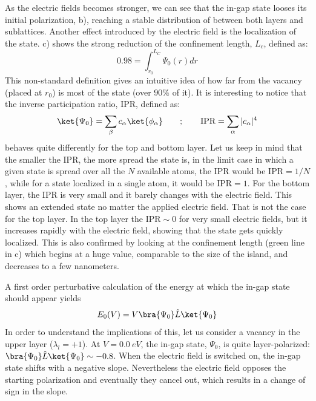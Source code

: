 As the electric fields becomes stronger, we can see that the in-gap state looses its initial polarization, b), reaching a stable distribution of between both layers and sublattices. Another effect introduced by the electric field is the localization of the state. c) shows the strong reduction of the confinement length, $L_c$, defined as:
\begin{equation}
  0.98 = \int_{r_0}^{L_C} \Psi_0(r) dr   %
\end{equation}
This non-standard definition gives an intuitive idea of how far from the vacancy (placed at $r_0$) is most of the state (over $90\%$ of it).
It is interesting to notice that the inverse participation ratio, IPR, defined as:
\begin{equation}
  \ket{\Psi_0} = \sum_\beta c_\alpha\ket{\phi_\alpha}\quad\quad;\quad\quad
  \text{IPR} = \sum_\alpha |c_\alpha|^4
\end{equation}
behaves quite differently for the top and bottom layer. Let us keep in mind that the smaller the IPR, the more spread the state is, in the limit case in which a given state is spread over all the $N$ available atoms, the IPR would be $\text{IPR}=1/N$, while for a state localized in a single atom, it would be $\text{IPR}=1$.
For the bottom layer, the IPR is very small and it barely changes with the electric field. This shows an extended state no matter the applied electric field. That is not the case for the top layer. In the top layer the $\text{IPR}\sim0$ for very small electric fields, but it increases rapidly with the electric field, showing that the state gets quickly localized. This is also confirmed by looking at the confinement length (green line in c) which begins at a huge value, comparable to the size of the island, and decreases to a few nanometers.


A first order perturbative calculation of the energy at which the in-gap state should appear yields
\begin{equation}
  E_0 (V) = V \bra{\Psi_0}\hat{L}\ket{\Psi_0}
\end{equation}
In order to understand the implications of this, let us consider a vacancy in the upper layer ($\lambda_l=+1$). At $V=\SI{0.0}{eV}$, the in-gap state, $\Psi_0$, is quite layer-polarized: $\bra{\Psi_0}\hat{L}\ket{\Psi_0}\sim-0.8$. When the electric field is switched on, the in-gap state shifts with a negative slope. Nevertheless the electric field opposes the starting polarization and eventually they cancel out, which results in a change of sign in the slope. %


